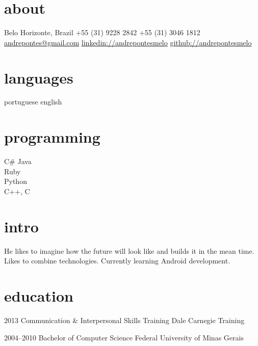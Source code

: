\documentclass[]{friggeri-cv}
\begin{document}


\begin{aside} %
\section{about}
Belo Horizonte, Brazil
+55 (31) 9228 2842
+55 (31) 3046 1812
~
\href{mailto:andrepontes@gmail.com}{andrepontes@gmail.com}
\href{https://br.linkedin.com/in/andrepontesmelo}{linkedin://andrepontesmelo}
\href{https://github.com/andrepontesmelo}{github://andrepontesmelo}
\section{languages}
portuguese
english
\section{programming}
C\#
Java\\Ruby\\Python\\C++, C
\end{aside}

\section{intro}
He likes to imagine how the future will look like and builds it in the mean time. Likes to combine technologies. Currently learning Android development.


\section{education}

\begin{entrylist}


\entry
{2013}
{Communication \& Interpersonal {\normalfont Skills Training}}
{Dale Carnegie Training}

\entry
{2004--2010}
{{\normalfont Bachelor of} Computer Science}
{Federal University of Minas Gerais}

\end{entrylist}
\end{document}
